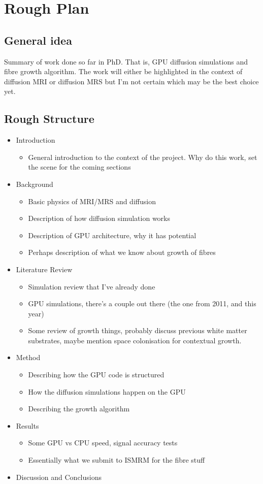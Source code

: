\chapter{Rough Plan	}
\label{sec:plan}

\section{General idea}
Summary of work done so far in PhD. That is, GPU diffusion simulations and fibre growth algorithm. 
The work will either be highlighted in the context of diffusion MRI or diffusion MRS but I'm not certain which may be the best choice yet. 

\section{Rough Structure}
\begin{itemize}
	\item Introduction
	\begin{itemize}
		\item General introduction to the context of the project. Why do this work, set the scene for the coming sections
	\end{itemize}
	\item Background
	\begin{itemize}
		\item Basic physics of MRI/MRS and diffusion
		\item Description of how diffusion simulation works 
		\item Description of GPU architecture, why it has potential
		\item Perhaps description of what we know about growth of fibres
	\end{itemize}
	\item Literature Review
	\begin{itemize}
		\item Simulation review that I've already done
		\item GPU simulations, there's a couple out there (the one from 2011, and this year)
		\item Some review of growth things, probably discuss previous white matter substrates, maybe mention space colonisation for contextual growth.
	\end{itemize}
	\item Method
	\begin{itemize}
		\item Describing how the GPU code is structured
		\item How the diffusion simulations happen on the GPU
		\item Describing the growth algorithm 
	\end{itemize}
	\item Results
	\begin{itemize}
		\item Some GPU vs CPU speed, signal accuracy tests
		\item Essentially what we submit to ISMRM for the fibre stuff 
	\end{itemize}
	\item Discussion and Conclusions
\end{itemize}


